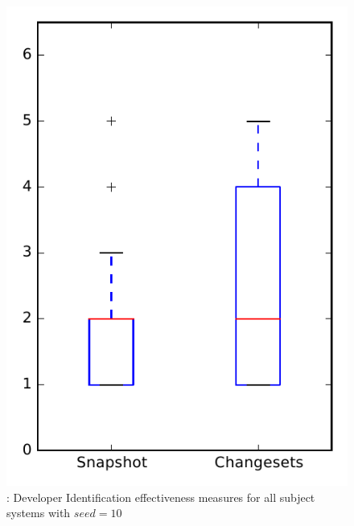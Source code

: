 
\begin{figure}
\centering
\includegraphics[height=0.4\textheight]{figures/dit_seed/rq1_overview_10}
\caption{\rtwo: Developer Identification effectiveness measures for all subject systems with $seed=10$}
\label{fig:dit_seed:rq1:overview}
\end{figure}
